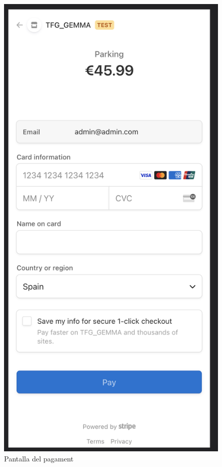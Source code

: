 \begin{figure}[H]
    \begin{center}
        \includegraphics[scale=0.50]{Fotos/pantalla5_pagament.png}
    \end{center}
    \caption{Pantalla del pagament}
    \label{fig:payment_photo}
\end{figure}

